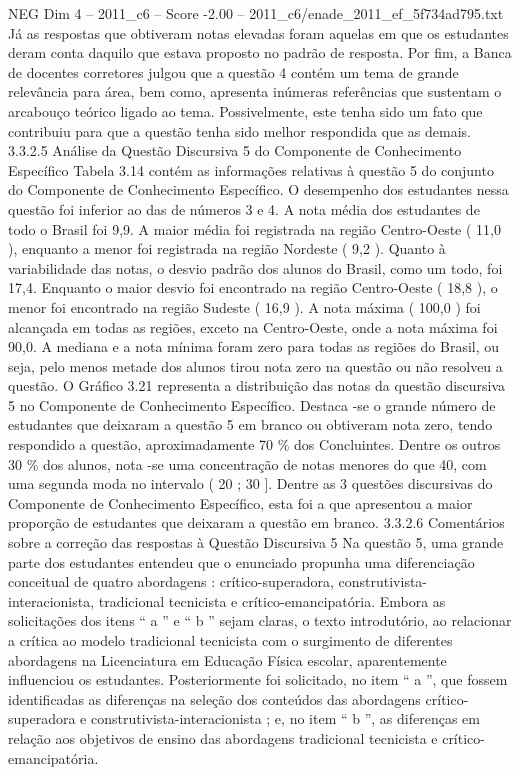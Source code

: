 \begin{textsample}{NEG Dim 4 – 2011\_c6 – Score -2.00 – 2011\_c6/enade\_2011\_ef\_5f734ad795.txt}
Já as respostas que obtiveram notas elevadas foram aquelas em que os estudantes deram conta daquilo que estava proposto no padrão de resposta.
Por fim, a Banca de docentes corretores julgou que a questão 4 contém um tema de grande relevância para área, bem como, apresenta inúmeras referências que sustentam o arcabouço teórico ligado ao tema.
Possivelmente, este tenha sido um fato que contribuiu para que a questão tenha sido melhor respondida que as demais. 3.3.2.5 Análise da Questão Discursiva 5 do Componente de Conhecimento Específico Tabela 3.14 contém as informações relativas à questão 5 do conjunto do Componente de Conhecimento Específico.
O desempenho dos estudantes nessa questão foi inferior ao das de números 3 e 4.
A nota média dos estudantes de todo o Brasil foi 9,9.
A maior média foi registrada na região Centro-Oeste ( 11,0 ), enquanto a menor foi registrada na região Nordeste ( 9,2 ).
Quanto à variabilidade das notas, o desvio padrão dos alunos do Brasil, como um todo, foi 17,4.
Enquanto o maior desvio foi encontrado na região Centro-Oeste ( 18,8 ), o menor foi encontrado na região Sudeste ( 16,9 ).
A nota máxima ( 100,0 ) foi alcançada em todas as regiões, exceto na Centro-Oeste, onde a nota máxima foi 90,0.
A mediana e a nota mínima foram zero para todas as regiões do Brasil, ou seja, pelo menos metade dos alunos tirou nota zero na questão ou não resolveu a questão.
O Gráfico 3.21 representa a distribuição das notas da questão discursiva 5 no Componente de Conhecimento Específico.
Destaca -se o grande número de estudantes que deixaram a questão 5 em branco ou obtiveram nota zero, tendo respondido a questão, aproximadamente 70 \% dos Concluintes.
Dentre os outros 30 \% dos alunos, nota -se uma concentração de notas menores do que 40, com uma segunda moda no intervalo ( 20 ; 30 ].
Dentre as 3 questões discursivas do Componente de Conhecimento Específico, esta foi a que apresentou a maior proporção de estudantes que deixaram a questão em branco. 3.3.2.6 Comentários sobre a correção das respostas à Questão Discursiva 5 Na questão 5, uma grande parte dos estudantes entendeu que o enunciado propunha uma diferenciação conceitual de quatro abordagens : crítico-superadora, construtivista-interacionista, tradicional tecnicista e crítico-emancipatória.
Embora as solicitações dos itens “ a ” e “ b ” sejam claras, o texto introdutório, ao relacionar a crítica ao modelo tradicional tecnicista com o surgimento de diferentes abordagens na Licenciatura em Educação Física escolar, aparentemente influenciou os estudantes.
Posteriormente foi solicitado, no item “ a ”, que fossem identificadas as diferenças na seleção dos conteúdos das abordagens crítico-superadora e construtivista-interacionista ; e, no item “ b ”, as diferenças em relação aos objetivos de ensino das abordagens tradicional tecnicista e crítico-emancipatória.

\end{textsample}
